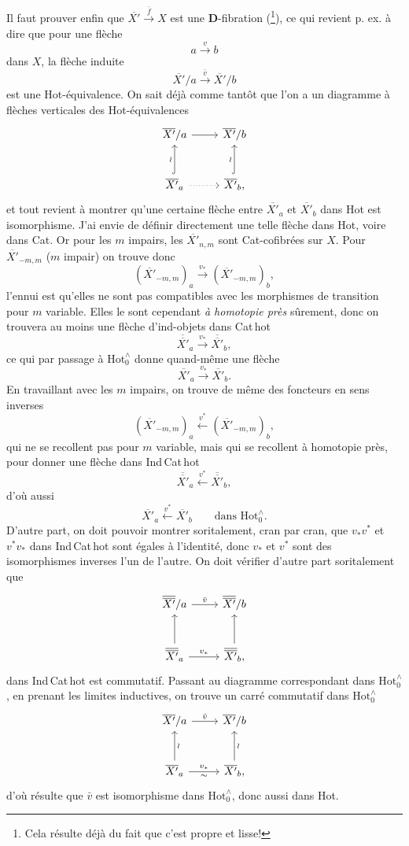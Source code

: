 \documentclass[11pt]{article}
\newcommand{\printedpage}[1]{\marginpar{\footnotesize p.~#1}}
\newcommand{\msp}[1]{\marginpar{\footnotesize [#1]}}
\newcommand{\Xb}{\overline{X'}}
\newcommand{\Xbb}{\overline{\overline{X'}}}
\newcommand{\Hotz}{\mathrm{Hot}^{\wedge}_{0}}
\begin{document}
\msp{page 154}
Il faut prouver enfin que $\Xb \xrightarrow{\bar f} X$ est une \textbf{D}-fibration (\footnote[39]{Cela résulte déjà du fait que c'est propre et lisse!}), ce qui revient p. ex. à dire que pour une flèche
\[
a \xrightarrow{v} b
\]
dans $X$, la flèche induite
\[
\Xb/a \xrightarrow{\bar v} \Xb/b
\]
est une Hot-équivalence. On sait déjà comme tantôt que l'on a un diagramme à flèches verticales des Hot-équivalences
\[
\begin{tikzcd}[row sep=large]
\Xb/a \arrow[r] & \Xb/b \\
\Xb_a \arrow[u, hook, "\wr"] \arrow[r, dotted] & \Xb_b, \arrow[u, hook, "\wr"]
\end{tikzcd}
\]
et tout revient à montrer qu'une certaine flèche entre $\Xb_a$ et $\Xb_b$ dans Hot est isomorphisme. J'ai envie de définir directement une telle flèche dans Hot, voire dans Cat. Or pour les $m$ impairs, les $\Xb_{n,m}$ sont Cat-cofibrées sur $X$. Pour $\Xb_{-m,m}$ ($m$ impair) on trouve donc
\[
(\Xb_{-m,m})_a \xrightarrow{v_*} (\Xb_{-m,m})_b,
\]
\msp{page 155}
l'ennui est qu'elles ne sont pas compatibles avec les morphismes de transition pour $m$ variable. Elles le sont cependant \textit{à homotopie près} sûrement, donc on trouvera au moins une flèche d'ind-objets dans Cat\,hot
\[
\Xbb_a \xrightarrow{v_*} \Xbb_b,
\]
ce qui par passage à $\Hotz$ donne quand-même une flèche
\[
\Xb_a \xrightarrow{v_*} \Xb_b.
\]
En travaillant avec les $m$ impairs, on trouve de même des foncteurs en sens inverses %
\[
(\Xb_{-m,m})_a \xleftarrow{v^*} (\Xb_{-m,m})_b,
\]
\printedpage{97}
qui ne se recollent pas pour $m$ variable, mais qui se recollent à homotopie près, pour donner une flèche dans Ind\,Cat\,hot
\[
\Xbb_a \xleftarrow{v^*} \Xbb_b,
\]
d'où aussi
\[
\Xb_a \xleftarrow{v^*} \Xb_b \qquad \text{dans } \Hotz.
\]
D'autre part, on doit pouvoir montrer soritalement,
\msp{page 156}
cran par cran, que $v_*v^*$ et $v^*v_*$ dans Ind\,Cat\,hot sont égales à l'identité, donc $v_*$ et $v^*$ sont des isomorphismes inverses l'un de l'autre. On doit vérifier d'autre part soritalement que
\[
\begin{tikzcd}[row sep=large]
\Xbb/a \arrow[r, "\bar v"] & \Xbb/b \\
\Xbb_a \arrow[u] \arrow[r, "v_*"] & \Xbb_b, \arrow[u]
\end{tikzcd}
\]
dans Ind\,Cat\,hot est commutatif. Passant au diagramme correspondant dans $\Hotz$, en prenant les limites inductives, on trouve un carré commutatif dans $\Hotz$
\[
\begin{tikzcd}[row sep=large]
\Xb/a \arrow[r, "\bar v"] & \Xb/b \\
\Xb_a \arrow[u, "\wr"'] \arrow[r, "v_*", "\sim"'] & \Xb_b, \arrow[u, "\wr"']
\end{tikzcd}
\]
d'où résulte que $\bar v$ est isomorphisme dans $\Hotz$, donc aussi dans Hot.
\end{document}
